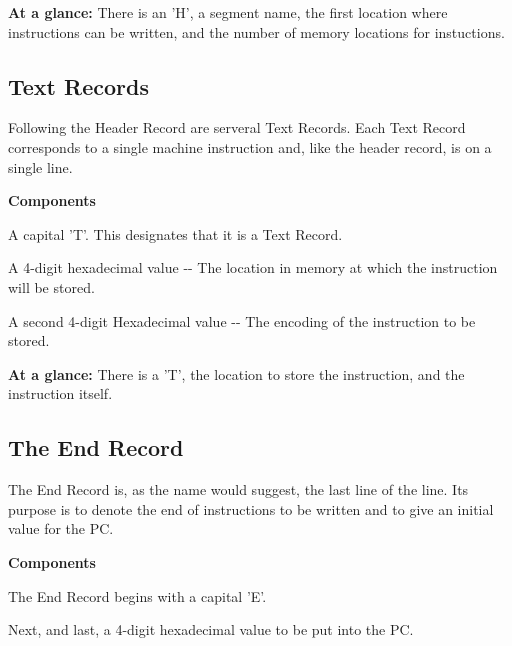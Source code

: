\begin{DoxyParagraph}{}
{\bfseries At a glance:} There is an 'H', a segment name, the first location where instructions can be written, and the number of memory locations for instuctions.
\end{DoxyParagraph}
\hypertarget{index_text}{}\subsection{Text Records}\label{index_text}
\begin{DoxyParagraph}{}
Following the Header Record are serveral Text Records. Each Text Record corresponds to a single machine instruction and, like the header record, is on a single line. 
\end{DoxyParagraph}
\begin{DoxyParagraph}{}
{\bfseries Components} \begin{DoxyItemize}
\item A capital 'T'. This designates that it is a Text Record. \item A 4-\/digit hexadecimal value -\/-\/ The location in memory at which the instruction will be stored. \item A second 4-\/digit Hexadecimal value -\/-\/ The encoding of the instruction to be stored. \end{DoxyItemize}

\end{DoxyParagraph}
\begin{DoxyParagraph}{}
{\bfseries At a glance:} There is a 'T', the location to store the instruction, and the instruction itself.
\end{DoxyParagraph}
\hypertarget{index_end}{}\subsection{The End Record}\label{index_end}
\begin{DoxyParagraph}{}
The End Record is, as the name would suggest, the last line of the line. Its purpose is to denote the end of instructions to be written and to give an initial value for the PC.\par
\par
 
\end{DoxyParagraph}
\begin{DoxyParagraph}{}
{\bfseries Components} \begin{DoxyItemize}
\item The End Record begins with a capital 'E'.\par
 \item Next, and last, a 4-\/digit hexadecimal value to be put into the PC. \end{DoxyItemize}

\end{DoxyParagraph}

